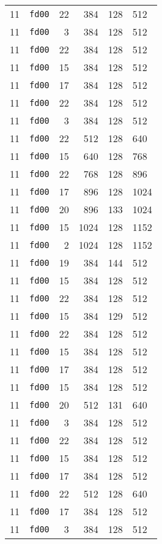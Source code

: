 \documentclass{article}
\begin{document}
\begin{table}[h!]
\begin{tabular}{llrrrl}
    11 & \texttt{fd00} & 22 & 384 & 128 & 512 \\
    11 & \texttt{fd00} & 3 & 384 & 128 & 512 \\
    11 & \texttt{fd00} & 22 & 384 & 128 & 512 \\
    11 & \texttt{fd00} & 15 & 384 & 128 & 512 \\
    11 & \texttt{fd00} & 17 & 384 & 128 & 512 \\
    11 & \texttt{fd00} & 22 & 384 & 128 & 512 \\
    11 & \texttt{fd00} & 3 & 384 & 128 & 512 \\
    11 & \texttt{fd00} & 22 & 512 & 128 & 640 \\
    11 & \texttt{fd00} & 15 & 640 & 128 & 768 \\
    11 & \texttt{fd00} & 22 & 768 & 128 & 896 \\
    11 & \texttt{fd00} & 17 & 896 & 128 & 1024 \\
    11 & \texttt{fd00} & 20 & 896 & 133 & 1024 \\
    11 & \texttt{fd00} & 15 & 1024 & 128 & 1152 \\
    11 & \texttt{fd00} & 2 & 1024 & 128 & 1152 \\
    11 & \texttt{fd00} & 19 & 384 & 144 & 512 \\
    11 & \texttt{fd00} & 15 & 384 & 128 & 512 \\
    11 & \texttt{fd00} & 22 & 384 & 128 & 512 \\
    11 & \texttt{fd00} & 15 & 384 & 129 & 512 \\
    11 & \texttt{fd00} & 22 & 384 & 128 & 512 \\
    11 & \texttt{fd00} & 15 & 384 & 128 & 512 \\
    11 & \texttt{fd00} & 17 & 384 & 128 & 512 \\
    11 & \texttt{fd00} & 15 & 384 & 128 & 512 \\
    11 & \texttt{fd00} & 20 & 512 & 131 & 640 \\
    11 & \texttt{fd00} & 3 & 384 & 128 & 512 \\
    11 & \texttt{fd00} & 22 & 384 & 128 & 512 \\
    11 & \texttt{fd00} & 15 & 384 & 128 & 512 \\
    11 & \texttt{fd00} & 17 & 384 & 128 & 512 \\
    11 & \texttt{fd00} & 22 & 512 & 128 & 640 \\
    11 & \texttt{fd00} & 17 & 384 & 128 & 512 \\
    11 & \texttt{fd00} & 3 & 384 & 128 & 512 \\

\end{tabular}
\end{table}
\end{document}
